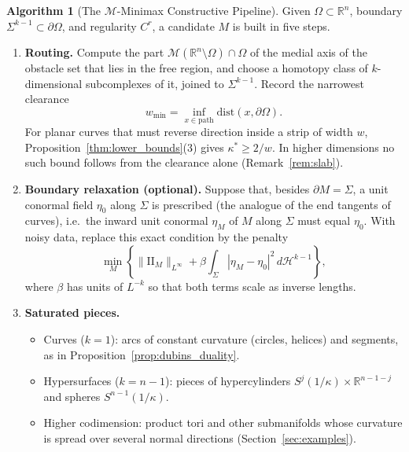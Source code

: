 \documentclass[11pt,reqno]{amsart}
\theoremstyle{definition}
\newtheorem{algorithm}[theorem]{Algorithm}
\providecommand{\R}{\mathbb{R}}
\providecommand{\II}{\mathrm{I\!I}}
\newcommand{\dist}{\mathrm{dist}}
\newcommand{\medial}{\mathcal{M}}
\providecommand{\Hsn}{\mathcal{H}}
\numberwithin{equation}{section}
\providecommand{\II}{\mathrm{II}}
\providecommand{\R}{\mathbb{R}}
\providecommand{\Hsn}{\mathcal{H}}
\begin{document}
\begin{algorithm}[The $\mathcal{M}$-Minimax Constructive Pipeline]
\label{alg:constructive}
Given $\Omega \subset \R^n$, boundary $\Sigma^{k-1} \subset \partial\Omega$, and regularity $C^r$, a candidate $M$ is built in five steps.

\begin{enumerate}
    \item \textbf{Routing.}
    Compute the part $\medial(\R^n\setminus\Omega) \cap \Omega$ of the medial axis of the obstacle set that lies in the free region, and choose a homotopy class of $k$-dimensional subcomplexes of it, joined to $\Sigma^{k-1}$. Record the narrowest clearance
    \begin{equation*}
    w_{\min} = \inf_{x \in \text{path}} \dist(x, \partial\Omega).
    \end{equation*} For planar curves that must reverse direction inside a strip of width $w$, Proposition~\ref{thm:lower_bounds}(3) gives $\kappa^* \ge 2/w$. In higher dimensions no such bound follows from the clearance alone (Remark~\ref{rem:slab}).

    \item \textbf{Boundary relaxation (optional).}
    Suppose that, besides $\partial M = \Sigma$, a unit conormal field $\eta_0$ along $\Sigma$ is prescribed (the analogue of the end tangents of curves), i.e.\ the inward unit conormal $\eta_M$ of $M$ along $\Sigma$ must equal $\eta_0$. With noisy data, replace this exact condition by the penalty
    \begin{equation}
    \min_{M} \left\{ \|\II_M\|_{L^\infty} + \beta \int_\Sigma |\eta_M - \eta_0|^2 \, d\Hsn^{k-1} \right\},
    \end{equation}
    where $\beta$ has units of $L^{-k}$ so that both terms scale as inverse lengths.

    \item \textbf{Saturated pieces.}
    \begin{itemize}
        \item Curves ($k=1$): arcs of constant curvature (circles, helices) and segments, as in Proposition~\ref{prop:dubins_duality}.
        \item Hypersurfaces ($k=n-1$): pieces of hypercylinders $S^j(1/\kappa) \times \R^{n-1-j}$ and spheres $S^{n-1}(1/\kappa)$.
        \item Higher codimension: product tori and other submanifolds whose curvature is spread over several normal directions (Section~\ref{sec:examples}).
    \end{itemize}


\end{enumerate}
\end{algorithm}
\end{document}
